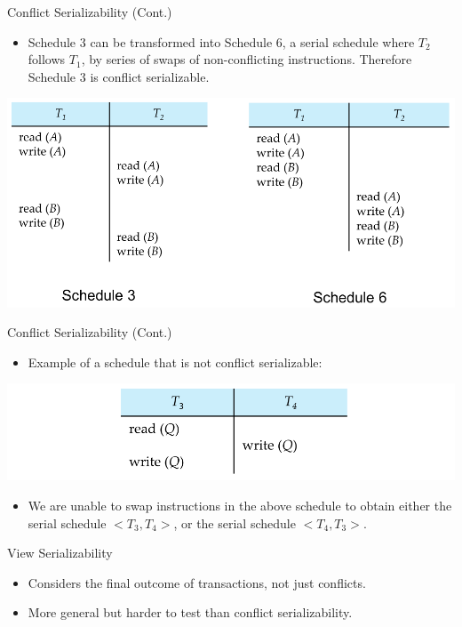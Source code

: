 \documentclass{beamer}
\begin{document}
\begin{frame}{Conflict Serializability (Cont.)}
    \begin{itemize}
        \item Schedule 3 can be transformed into Schedule 6, a serial schedule where $T_2$ follows $T_1$, by series of swaps of non-conflicting instructions. Therefore Schedule 3 is conflict serializable.
    \end{itemize}
    \centering
    \includegraphics[width=.9\textwidth]{figures/conflict_ser1}
\end{frame}

\begin{frame}{Conflict Serializability (Cont.)}
    \begin{itemize}
        \item Example of a schedule that is not conflict serializable:
    \end{itemize}
    \centering
    \includegraphics[width=.9\textwidth]{figures/conflict_ser2}
    \begin{itemize}
        \item We are unable to swap instructions in the above schedule to obtain either the serial schedule $< T_3, T_4 >$, or the serial schedule $< T_4, T_3 >$.
    \end{itemize}
\end{frame}

\begin{frame}{View Serializability}
    \begin{itemize}
        \item Considers the final outcome of transactions, not just conflicts.
        \item More general but harder to test than conflict serializability.
    \end{itemize}
\end{frame}
\end{document}

